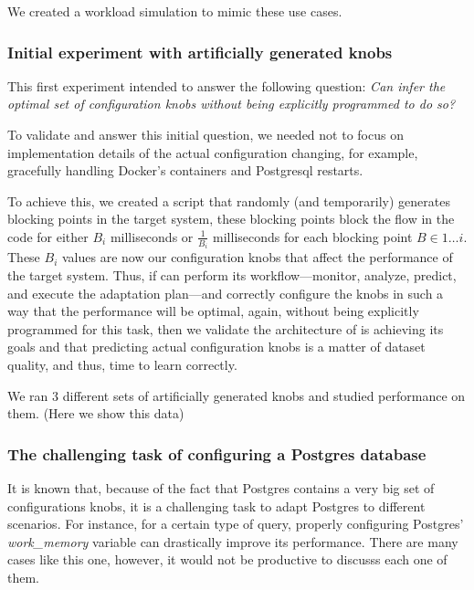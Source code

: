 We created a workload simulation to mimic these use cases.

\subsubsection{Initial experiment with artificially generated knobs}

This first experiment intended to answer the following question: \emph{Can \projectname{} infer the optimal set of configuration knobs without being explicitly programmed to do so?}

To validate and answer this initial question, we needed not to focus on implementation details of the actual configuration changing, for example, gracefully handling Docker's containers and Postgresql restarts.

To achieve this, we created a script that randomly (and temporarily) generates blocking points in the target system, these blocking points block the flow in the code for either $B_i$ milliseconds or $\frac{1}{B_i}$ milliseconds for each blocking point $B \in 1 \dots i$. These $B_i$ values are now our configuration knobs that affect the performance of the target system. Thus, if \projectname{} can perform its workflow---monitor, analyze, predict, and execute the adaptation plan---and correctly configure the knobs in such a way that the performance will be optimal, again, without being explicitly programmed for this task, then we validate the architecture of \projectname{} is achieving its goals and that predicting actual configuration knobs is a matter of dataset quality, and thus, time to learn correctly.

We ran 3 different sets of artificially generated knobs and studied \projectname{} performance on them. (Here we show this data)

\subsubsection{The challenging task of configuring a Postgres database}

It is known that, because of the fact that Postgres contains a very big set of configurations knobs, it is a challenging task to adapt Postgres to different scenarios. For instance, for a certain type of query, properly configuring Postgres' \textit{work\_memory} variable can drastically improve its performance. There are many cases like this one, however, it would not be productive to discusss each one of them.

